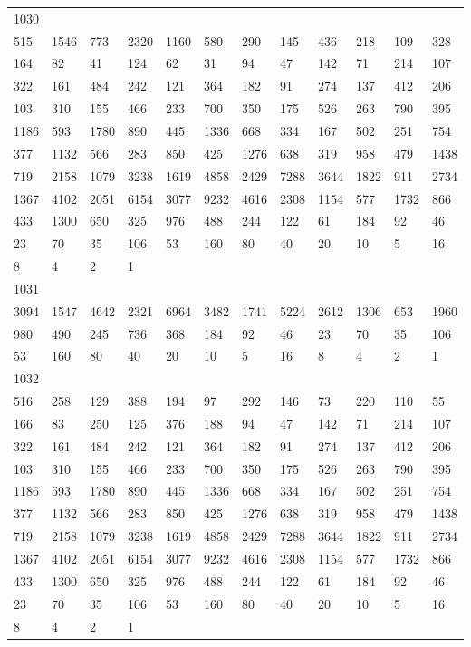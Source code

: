 \begin{longtable}{llllllllllll}
1030&&&&&&&&&&&\\
515& 1546& 773& 2320& 1160& 580& 290& 145& 436& 218& 109& 328\\
164& 82& 41& 124& 62& 31& 94& 47& 142& 71& 214& 107\\
322& 161& 484& 242& 121& 364& 182& 91& 274& 137& 412& 206\\
103& 310& 155& 466& 233& 700& 350& 175& 526& 263& 790& 395\\
1186& 593& 1780& 890& 445& 1336& 668& 334& 167& 502& 251& 754\\
377& 1132& 566& 283& 850& 425& 1276& 638& 319& 958& 479& 1438\\
719& 2158& 1079& 3238& 1619& 4858& 2429& 7288& 3644& 1822& 911& 2734\\
1367& 4102& 2051& 6154& 3077& 9232& 4616& 2308& 1154& 577& 1732& 866\\
433& 1300& 650& 325& 976& 488& 244& 122& 61& 184& 92& 46\\
23& 70& 35& 106& 53& 160& 80& 40& 20& 10& 5& 16\\
8& 4& 2& 1& \\

1031&&&&&&&&&&&\\
3094& 1547& 4642& 2321& 6964& 3482& 1741& 5224& 2612& 1306& 653& 1960\\
980& 490& 245& 736& 368& 184& 92& 46& 23& 70& 35& 106\\
53& 160& 80& 40& 20& 10& 5& 16& 8& 4& 2& 1\\

1032&&&&&&&&&&&\\
516& 258& 129& 388& 194& 97& 292& 146& 73& 220& 110& 55\\
166& 83& 250& 125& 376& 188& 94& 47& 142& 71& 214& 107\\
322& 161& 484& 242& 121& 364& 182& 91& 274& 137& 412& 206\\
103& 310& 155& 466& 233& 700& 350& 175& 526& 263& 790& 395\\
1186& 593& 1780& 890& 445& 1336& 668& 334& 167& 502& 251& 754\\
377& 1132& 566& 283& 850& 425& 1276& 638& 319& 958& 479& 1438\\
719& 2158& 1079& 3238& 1619& 4858& 2429& 7288& 3644& 1822& 911& 2734\\
1367& 4102& 2051& 6154& 3077& 9232& 4616& 2308& 1154& 577& 1732& 866\\
433& 1300& 650& 325& 976& 488& 244& 122& 61& 184& 92& 46\\
23& 70& 35& 106& 53& 160& 80& 40& 20& 10& 5& 16\\
8& 4& 2& 1& \\


\end{longtable}
